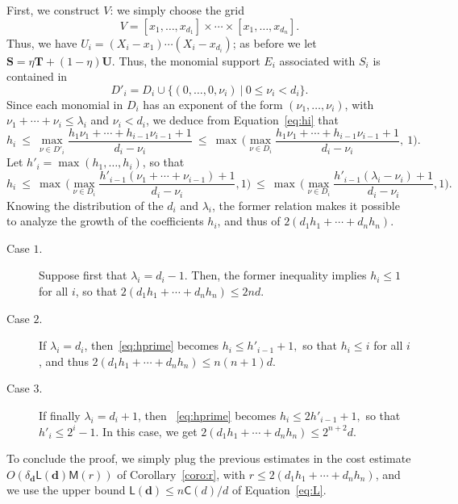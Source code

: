 \documentclass[amsthm]{elsart}
\def\d {\ensuremath{\mathbf{d}}}
\def\C {\ensuremath{\mathsf{C}}}
\def\L {\ensuremath{\mathsf{L}}}
\def\S {\ensuremath{\mathbf{S}}}
\def\T {\ensuremath{\mathbf{T}}}
\def\M {\ensuremath{\mathsf{M}}}
\def\U {\ensuremath{\mathbf{U}}}
\theoremstyle{plain}
\begin{document}
\begin{pf}
First, we construct $V$: we simply choose the grid
\begin{equation}\label{eq:V}
V = [x_1,\dots,x_{d_1}] \times \cdots \times [x_1,\dots,x_{d_n}].
\end{equation}
Thus, we have $U_i = (X_i-x_1) \cdots (X_i-x_{d_i})$; as before we let
$\S =\eta \T + (1-\eta) \U$. Thus, the monomial support $E_i$ associated with
$S_i$ is contained in
$$D'_i = D_i \cup \{(0,\dots,0,\nu_i) \ | \ 0 \le \nu_i < d_i\}.$$
Since each monomial in $D_i$ has an exponent of the form
$(\nu_1,\dots,\nu_i)$, with $\nu_1+\cdots + \nu_i \le \lambda_i$ and
$\nu_i < d_i$, we deduce from Equation~\eqref{eq:hi} that
$$h_i\ \le \
 \max_{\nu \in D'_i} \frac{ h_1 \nu_1+\cdots + h_{i-1} \nu_{i-1} + 1} {d_i-\nu_i}
\ \le \
 \max\, \Big(\max_{\nu \in D_i} \frac{ h_1 \nu_1+\cdots + h_{i-1} \nu_{i-1} + 1} {d_i-\nu_i}, \ 1\Big).$$
Let $h'_i = \max(h_1,\dots,h_i)$, so that 
\begin{equation}
  \label{eq:hprime}
h_i\ \le\ 
 \max\, \Big( \max_{\nu \in D_i} \frac{  h'_{i-1}(\nu_1+\cdots + \nu_{i-1}) + 1} {d_i-\nu_i}, 1 \Big)
\ \le\
 \max\, \Big( \max_{\nu \in D_i} \frac{  h'_{i-1}(\lambda_i  - \nu_i) + 1} {d_i-\nu_i}, 1 \Big).
\end{equation}
Knowing the distribution of the $d_i$ and $\lambda_i$, the former
relation makes it possible to analyze the growth of the coefficients
$h_i$, and thus of $ 2(d_1 h_1 + \cdots + d_n h_n)$.

\smallskip

\begin{description}
\item [Case $1$.] Suppose first that $\lambda_i = d_i-1$. Then, the
  former inequality implies $h_i \le 1$ for all $i$, so that $2(d_1
  h_1 + \cdots + d_n h_n) \le 2 n d. $

\smallskip

\item [Case $2$.] If $\lambda_i = d_i$, then~\eqref{eq:hprime} becomes
  $h_i \le h'_{i-1} + 1,$ so that $h_i \le i$ for all $i$, and thus
$2(d_1 h_1 + \cdots + d_n h_n) \le  n(n+1) d. $

\smallskip

\item [Case $3$.] If finally $\lambda_i=d_i+1$, then ~\eqref{eq:hprime}
  becomes $h_i \le 2h'_{i-1} + 1,$ so that $h'_i \le 2^i-1$. In this
  case, we get $2(d_1 h_1 + \cdots + d_n h_n) \le 2^{n+2}d. $
\end{description}

\smallskip
\noindent
To conclude the proof, we simply plug the previous estimates in the
cost estimate $O(\delta_\d \L(\d)\M(r))$ of Corollary~\ref{coro:r},
with $r \le 2(d_1 h_1 + \cdots + d_n h_n)$, and we use the upper bound
$\L(\d) \le n\C(d)/d$ of Equation~\eqref{eq:L}.
\end{pf}
\end{document}
